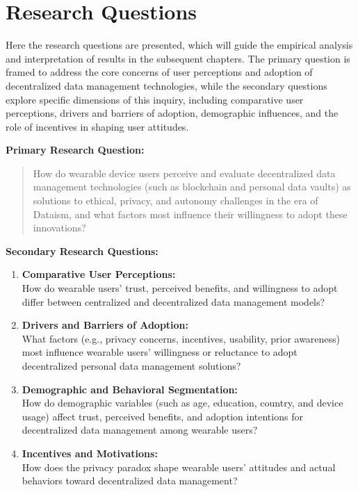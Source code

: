 
\section{Research Questions}

Here the research questions are presented, which will guide the empirical analysis and interpretation of results in the subsequent chapters. The primary question is framed to address the core concerns of user perceptions and adoption of decentralized data management technologies, while the secondary questions explore specific dimensions of this inquiry, including comparative user perceptions, drivers and barriers of adoption, demographic influences, and the role of incentives in shaping user attitudes.

\textbf{Primary Research Question:}

\begin{quote}
How do wearable device users perceive and evaluate decentralized data management technologies (such as blockchain and personal data vaults) as solutions to ethical, privacy, and autonomy challenges in the era of Dataism, and what factors most influence their willingness to adopt these innovations?
\end{quote}

\textbf{Secondary Research Questions:}

\begin{enumerate}
    \item \textbf{Comparative User Perceptions:} \\
    How do wearable users’ trust, perceived benefits, and willingness to adopt differ between centralized and decentralized data management models?
    
    \item \textbf{Drivers and Barriers of Adoption:} \\
    What factors (e.g., privacy concerns, incentives, usability, prior awareness) most influence wearable users’ willingness or reluctance to adopt decentralized personal data management solutions?
    
    \item \textbf{Demographic and Behavioral Segmentation:} \\
    How do demographic variables (such as age, education, country, and device usage) affect trust, perceived benefits, and adoption intentions for decentralized data management among wearable users?

	\item \textbf{Incentives and Motivations:} \\
	How does the privacy paradox shape wearable users’ attitudes and actual behaviors toward decentralized data management?
    
\end{enumerate}

